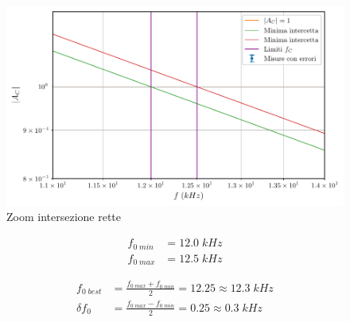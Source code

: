 \documentclass[11pt, a4paper]{article}
\numberwithin{equation}{section} %
\begin{document}
\begin{figure}[ht!]
    \includegraphics{onda_sin_AC(f)_taglio_frequenza.pdf}
    \caption{Zoom intersezione rette}
    \label{fig:frequenza di taglio C zoom}
\end{figure}


\begin{align*}
    f_{0 \; min} &= 12.0 \; kHz \\
    f_{0 \; max} &= 12.5 \; kHz
\end{align*}

\begin{align*}
    f_{0 \; best} &= \frac{f_{0 \; max} + f_{0 \; min}}{2} = 12.25 \approx 12.3 \; kHz \\
    \delta f_{0} &= \frac{f_{0 \; max} - f_{0 \; min}}{2} = 0.25 \approx 0.3 \; kHz
\end{align*}
\end{document}
